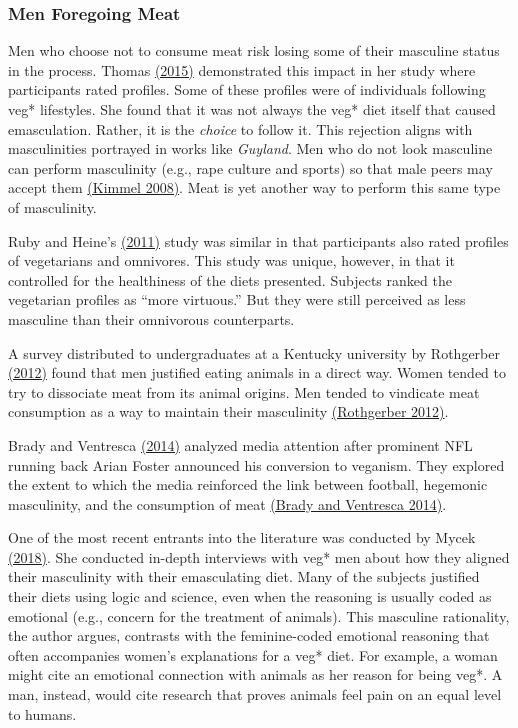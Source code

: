 \documentclass[twoside]{report}
\begin{document}
\subsubsection{Men Foregoing Meat}

Men who choose not to consume meat risk losing some of their masculine status in the process. Thomas \hyperlink{thomas}{(2015)} demonstrated this impact in her study where participants rated profiles. Some of these profiles were of individuals following veg* lifestyles. She found that it was not always the veg* diet itself that caused emasculation. Rather, it is the \emph{choice} to follow it. This rejection aligns with masculinities portrayed in works like \emph{Guyland}. Men who do not look masculine can perform masculinity (e.g., rape culture and sports) so that male peers may accept them \hyperlink{kimmel}{(Kimmel 2008)}. Meat is yet another way to perform this same type of masculinity.

Ruby and Heine's \hyperlink{ruby}{(2011)} study was similar in that participants also rated profiles of vegetarians and omnivores. This study was unique, however, in that it controlled for the healthiness of the diets presented. Subjects ranked the vegetarian profiles as ``more virtuous.'' But they were still perceived as less masculine than their omnivorous counterparts.

A survey distributed to undergraduates at a Kentucky university by Rothgerber \hyperlink{rothgerber}{(2012)} found that men justified eating animals in a direct way. Women tended to try to dissociate meat from its animal origins. Men tended to vindicate meat consumption as a way to maintain their masculinity \hyperlink{rothgerber}{(Rothgerber 2012)}.

Brady and Ventresca \hyperlink{brady}{(2014)} analyzed media attention after prominent NFL running back Arian Foster announced his conversion to veganism. They explored the extent to which the media reinforced the link between football, hegemonic masculinity, and the consumption of meat \hyperlink{brady}{(Brady and Ventresca 2014)}.

One of the most recent entrants into the literature was conducted by Mycek \hyperlink{mycek}{(2018)}. She conducted in-depth interviews with veg* men about how they aligned their masculinity with their emasculating diet. Many of the subjects justified their diets using logic and science, even when the reasoning is usually coded as emotional (e.g., concern for the treatment of animals). This masculine rationality, the author argues, contrasts with the feminine-coded emotional reasoning that often accompanies women's explanations for a veg* diet. For example, a woman might cite an emotional connection with animals as her reason for being veg*. A man, instead, would cite research that proves animals feel pain on an equal level to humans.
\end{document}
